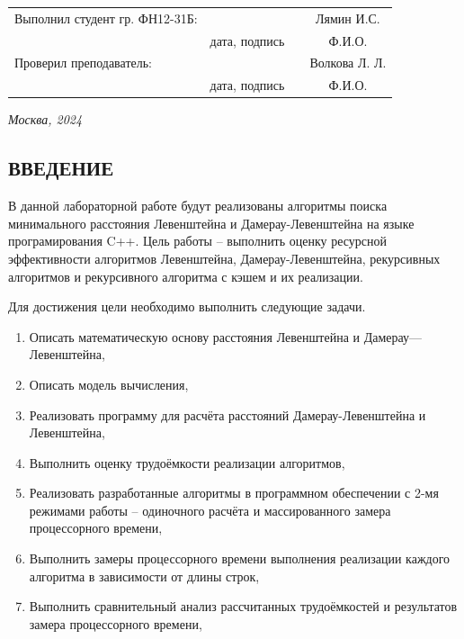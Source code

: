 \documentclass[14pt]{article}
\begin{document}
	\fontsize{14}{21}\selectfont
	\vspace{5cm}
	
	
	\noindent\begin{tabularx}{\textwidth}{ X >{\centering}p{4cm} p{1cm} c }
		Выполнил студент гр. ФН12-31Б: & & & Лямин И.С.\\ \cline{2-2} \cline{4-4}
		& \fontsize{10}{15}\selectfont дата, подпись & & \fontsize{10}{15}\selectfont Ф.И.О. \\
		Проверил преподаватель: & & & Волкова Л. Л.\\ \cline{2-2} \cline{4-4}
		& \fontsize{10}{15}\selectfont дата, подпись & & \fontsize{10}{15}\selectfont Ф.И.О.
	\end{tabularx}
	
	\vspace{\fill}
	
	\begin{center}
		\it{Москва}, 2024
	\end{center}

\thispagestyle{empty} 

\newpage
\renewcommand{\contentsname}{\centering{СОДЕРЖАНИЕ}}
\setcounter{page}{2}
\tableofcontents

\newpage
\begin{center}
    \section*{ВВЕДЕНИЕ} 
\end{center}

В данной лабораторной работе будут реализованы алгоритмы поиска минимального расстояния Левенштейна и Дамерау-Левенштейна на языке програмирования C++.
Цель работы -- выполнить оценку ресурсной эффективности алгоритмов Левенштейна, Дамерау-Левенштейна, рекурсивных алгоритмов и рекурсивного алгоритма с кэшем и их реализации.\par
Для достижения цели необходимо выполнить следующие задачи.
\begin{enumerate}
    \item Описать математическую основу расстояния Левенштейна и Дамерау---Левен\-штейна,
    \item Описать модель вычисления,
    \item Реализовать программу для расчёта расстояний Дамерау-Левенштейна и Левенштейна,
    \item Выполнить оценку трудоёмкости реализации алгоритмов,
    \item Реализовать разработанные алгоритмы в программном обеспечении с 2-мя режимами работы -- одиночного расчёта и массированного замера процессорного времени,
    \item Выполнить замеры процессорного времени выполнения реализации каждого алгоритма в зависимости от длины строк,
    \item Выполнить сравнительный анализ рассчитанных трудоёмкостей и результатов замера процессорного времени,
\end{enumerate}
\end{document}
